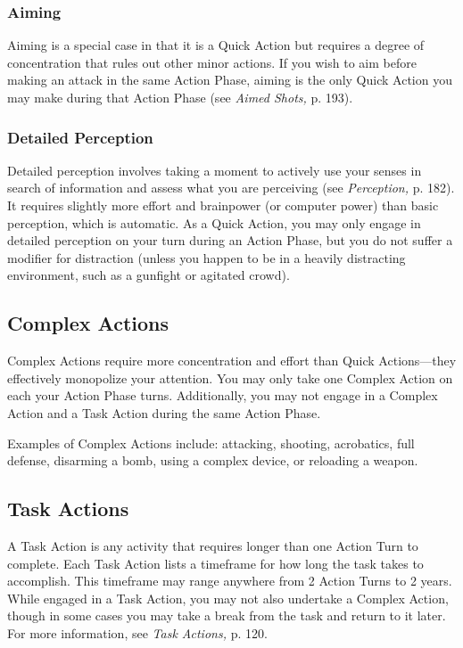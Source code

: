 \subsubsection{Aiming}

Aiming is a special case in that it is a Quick Action 
but requires a degree of concentration that rules out 
other minor actions. If you wish to aim before making 
an attack in the same Action Phase, aiming is the only 
Quick Action you may make during that Action Phase 
(see \textit{Aimed Shots,} p. 193).

\subsubsection{Detailed Perception}

Detailed perception involves taking a moment to 
actively use your senses in search of information and 
assess what you are perceiving (see \textit{Perception,} p. 
182). It requires slightly more effort and brainpower 
(or computer power) than basic perception, which is 
automatic. As a Quick Action, you may only engage 
in detailed perception on your turn during an Action 
Phase, but you do not suffer a modifier for distraction
(unless you happen to be in a heavily distracting
environment, such as a gunfight or agitated crowd).

\subsection{Complex Actions}

Complex Actions require more concentration and 
effort than Quick Actions—they effectively monopolize
your attention. You may only take one Complex
Action on each your Action Phase turns. Additionally, 
you may not engage in a Complex Action and a Task 
Action during the same Action Phase.

Examples of Complex Actions include: attacking, 
shooting, acrobatics, full defense, disarming a bomb, 
using a complex device, or reloading a weapon.

\subsection{Task Actions}

A Task Action is any activity that requires longer than one 
Action Turn to complete. Each Task Action lists a timeframe
for how long the task takes to accomplish. This
timeframe may range anywhere from 2 Action Turns to 2 
years. While engaged in a Task Action, you may not also 
undertake a Complex Action, though in some cases you 
may take a break from the task and return to it later. For 
more information, see \textit{Task Actions,} p. 120.

